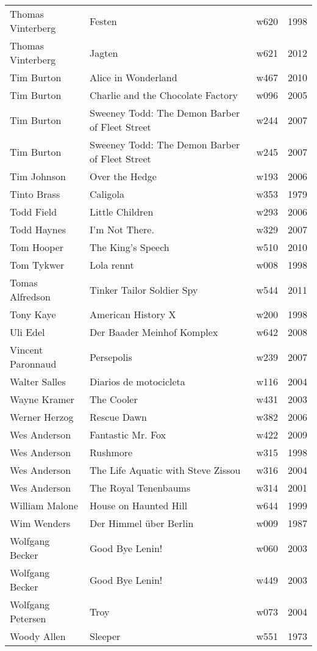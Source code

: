\documentclass{article}
\begin{document}
\begin {center}
\begin{longtable}{l p{10cm} l l}
Thomas Vinterberg & Festen & w620 & 1998 \\
Thomas Vinterberg & Jagten & w621 & 2012 \\
Tim Burton & Alice in Wonderland & w467 & 2010 \\
Tim Burton & Charlie and the Chocolate Factory & w096 & 2005 \\
Tim Burton & Sweeney Todd: The Demon Barber of Fleet Street & w244 & 2007 \\
Tim Burton & Sweeney Todd: The Demon Barber of Fleet Street & w245 & 2007 \\
Tim Johnson & Over the Hedge & w193 & 2006 \\
Tinto Brass & Caligola & w353 & 1979 \\
Todd Field & Little Children & w293 & 2006 \\
Todd Haynes & I'm Not There. & w329 & 2007 \\
Tom Hooper & The King's Speech & w510 & 2010 \\
Tom Tykwer & Lola rennt & w008 & 1998 \\
Tomas Alfredson & Tinker Tailor Soldier Spy & w544 & 2011 \\
Tony Kaye & American History X & w200 & 1998 \\
Uli Edel & Der Baader Meinhof Komplex & w642 & 2008 \\
Vincent Paronnaud & Persepolis & w239 & 2007 \\
Walter Salles & Diarios de motocicleta & w116 & 2004 \\
Wayne Kramer & The Cooler & w431 & 2003 \\
Werner Herzog & Rescue Dawn & w382 & 2006 \\
Wes Anderson & Fantastic Mr. Fox & w422 & 2009 \\
Wes Anderson & Rushmore & w315 & 1998 \\
Wes Anderson & The Life Aquatic with Steve Zissou & w316 & 2004 \\
Wes Anderson & The Royal Tenenbaums & w314 & 2001 \\
William Malone & House on Haunted Hill & w644 & 1999 \\
Wim Wenders & Der Himmel über Berlin & w009 & 1987 \\
Wolfgang Becker & Good Bye Lenin! & w060 & 2003 \\
Wolfgang Becker & Good Bye Lenin! & w449 & 2003 \\
Wolfgang Petersen & Troy & w073 & 2004 \\
Woody Allen & Sleeper & w551 & 1973 \\

\end{longtable}
\end{center}
\end{document}

